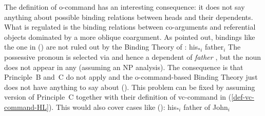 \documentclass[output=paper
	        ,collection
	        ,collectionchapter
 	        ,biblatex
                ,babelshorthands
                ,newtxmath
                ,draftmode
                ,colorlinks, citecolor=brown
]{langscibook}
\begin{document}
The definition of o-command has an interesting consequence: it does not say anything about possible
binding relations between heads and their dependents. What is regulated is the binding relations
between co-arguments and referential objects dominated by a more oblique coargument. As
\citet[]{Mueller99a} pointed out, bindings like the one in () are not ruled out by
the Binding Theory of \citet[Chapter~6]{ps2}: 
\ea
his$_{*i}$ father$_i$
\z
The possessive pronoun is selected via \spr and hence a dependent of \emph{father}
\citep{MuellerHeadless,MyPM2020a}, but the noun does not appear in any \argstl (assuming an NP
analysis). The consequence is that Principle~B and~C do not apply and the o-command-based Binding Theory just
does not have anything to say about (). This problem can be fixed by assuming 
version of Principle~C together with their definition of vc-command in (\ref{def-vc-command-HL}).
This would also cover cases like ():
\ea
his$_{*i}$ father of John$_i$
\z
\end{document}
